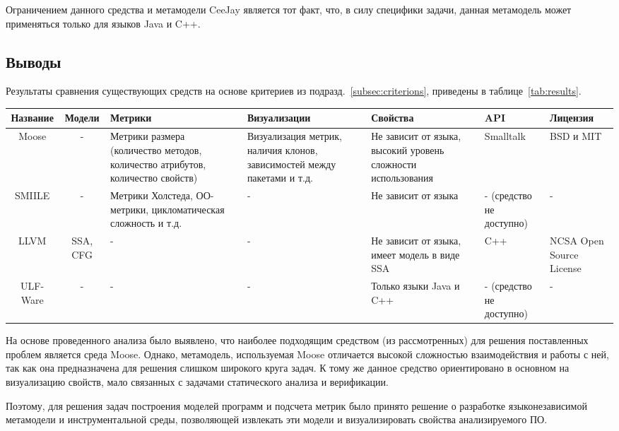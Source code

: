 Ограничением данного средства и метамодели CeeJay является тот факт, что, в силу
специфики задачи, данная метамодель может применяться только для языков Java и
C++.

\subsection{Выводы}

Результаты сравнения существующих средств на основе критериев из
подразд.~\ref{subsec:criterions}, приведены в таблице~\ref{tab:results}.

\begin{sidewaystable}
\scriptsize
\begin{tabularx}{\textwidth}{|c|c|X|X|X|X|X|}
\hline
Название & Модели & Метрики & Визуализации & Свойства & API & Лицензия \\ \hline
Moose & - & Метрики размера (количество методов, количество атрибутов, количество свойств) & Визуализация метрик, наличия клонов, зависимостей между пакетами и т.д. & Не зависит от языка, высокий уровень сложности использования & Smalltalk & BSD и MIT \\ \hline
SMIILE & - & Метрики Холстеда, ОО-метрики, цикломатическая сложность и т.д. & - & Не зависит от языка & - (средство не доступно) & - \\ \hline
LLVM & SSA, CFG & - & - & Не зависит от языка, имеет модель в виде SSA & C++ & NCSA Open Source License \\ \hline
ULF-Ware & - & - & - & Только языки Java и C++ & - (средство не доступно) & - \\ \hline
\end{tabularx}
\caption{Результаты сравнения существующих решений}
\label{tab:results}
\end{sidewaystable}

На основе проведенного анализа было выявлено, что наиболее подходящим средством
(из рассмотренных) для решения поставленных проблем является среда Moose.
Однако, метамодель, используемая Moose отличается высокой сложностью
взаимодействия и работы с ней, так как она предназначена для решения слишком
широкого круга задач. К тому же данное средство ориентировано в основном на
визуализацию свойств, мало связанных с задачами статического анализа и
верификации.

Поэтому, для решения задач построения моделей программ и подсчета метрик было
принято решение о разработке языконезависимой метамодели и инструментальной
среды, позволяющей извлекать эти модели и визуализировать свойства
анализируемого ПО.
